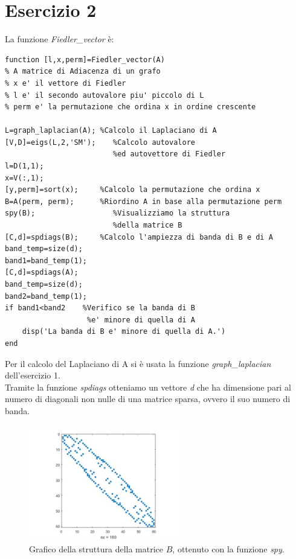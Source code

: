 \documentclass[11pt,a4paper,twoside,openright,titlepage,
                           headinclude,footinclude,BCOR5mm,
                           numbers=noenddot,cleardoublepage=empty,
                           tablecaptionabove]{scrbook}
\begin{document}
\section{Esercizio 2}
La funzione \emph{Fiedler\_vector} è:
\begin{lstlisting}[frame=trBL]
function [l,x,perm]=Fiedler_vector(A)
% A matrice di Adiacenza di un grafo
% x e' il vettore di Fiedler
% l e' il secondo autovalore piu' piccolo di L
% perm e' la permutazione che ordina x in ordine crescente

L=graph_laplacian(A); %Calcolo il Laplaciano di A 
[V,D]=eigs(L,2,'SM');    %Calcolo autovalore
                         %ed autovettore di Fiedler
l=D(1,1);
x=V(:,1);
[y,perm]=sort(x);     %Calcolo la permutazione che ordina x
B=A(perm, perm);      %Riordino A in base alla permutazione perm
spy(B);                  %Visualizziamo la struttura 
                         %della matrice B
[C,d]=spdiags(B);     %Calcolo l'ampiezza di banda di B e di A
band_temp=size(d);
band1=band_temp(1);
[C,d]=spdiags(A);
band_temp=size(d);
band2=band_temp(1);
if band1<band2    %Verifico se la banda di B 
                   %e' minore di quella di A
    disp('La banda di B e' minore di quella di A.')
end
\end{lstlisting}
Per il calcolo del Laplaciano di A si è usata la funzione \emph{graph\_laplacian} dell'esercizio 1.\\
Tramite la funzione \emph{spdiags} otteniamo un vettore \emph{d} che ha dimensione pari al numero di diagonali non nulle di una matrice sparsa, ovvero il suo numero di banda.

\begin{figure}[h!]
\begin{center}
\includegraphics[width=0.6\textwidth]{figs/SpyB.jpg}
\caption{Grafico della struttura della matrice $B$, ottenuto con la funzione \emph{spy}.}
\end{center}
\end{figure}
\end{document}

